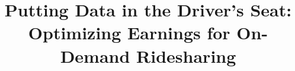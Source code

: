 \documentclass[sigconf]{acmart}
\begin{document}
\title{Putting Data in the Driver's Seat:\\
Optimizing Earnings for On-Demand Ridesharing}


%
%


%
%
% 





\maketitle









% 
\balance
 
\end{document}
